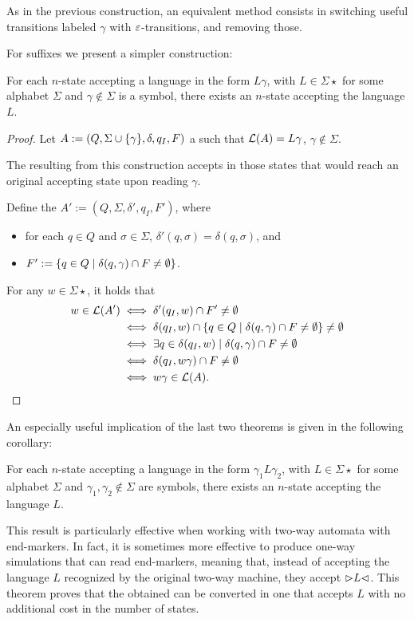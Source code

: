 As in the previous construction, an equivalent method consists in switching useful transitions labeled $\gamma$ with $\varepsilon$-transitions, and removing those.

For suffixes we present a simpler construction:
\begin{thrm}
	For each $n$-state \ONFA accepting a language in the form $L\gamma$, with $L\in\Sigma\star$ for some alphabet $\Sigma$ and $\gamma\notin\Sigma$ is a symbol, there exists an $n$-state \ONFA accepting the language $L$.
\end{thrm}
\begin{proof}
	Let $A:=(Q,\Sigma\cup\{\gamma\},\delta,q_I,F)$ a \ONFA such that $\mathcal L(A)=L\gamma$, $\gamma\notin\Sigma$.

	The \ONFA resulting from this construction accepts in those states that would reach an original accepting state upon reading $\gamma$.

	Define the \ONFA $A':=(Q,\Sigma,\delta',q_I,F')$, where
	\begin{itemize}
		\item for each $q\in Q$ and $\sigma\in\Sigma$, $\delta'(q,\sigma)=\delta(q,\sigma)$, and
		\item $F':=\{q\in Q\mid \delta(q,\gamma)\cap F\ne\emptyset\}$.
	\end{itemize}

	For any $w\in\Sigma\star$, it holds that
	\begin{align*}
		w\in\mathcal L(A') & \iff \delta'(q_I,w)\cap F'\ne\emptyset                                                 \\
		                 & \iff \delta(q_I,w)\cap \{q\in Q\mid \delta(q,\gamma)\cap F\ne\emptyset\}\ne\emptyset \\
		                 & \iff \exists q\in\delta(q_I,w)\mid \delta(q,\gamma)\cap F\ne\emptyset                  \\
		                 & \iff \delta(q_I,w\gamma)\cap F\ne\emptyset                                             \\
		                 & \iff w\gamma\in\mathcal L(A) \text. \qedhere
	\end{align*}
\end{proof}

An especially useful implication of the last two theorems is given in the following corollary:
\begin{coro}
	For each $n$-state \ONFA accepting a language in the form $\gamma_1 L\gamma_2$, with $L\in\Sigma\star$ for some alphabet $\Sigma$ and $\gamma_1,\gamma_2\notin\Sigma$ are symbols, there exists an $n$-state \ONFA accepting the language $L$.
\end{coro}
This result is particularly effective when working with two-way automata with end-markers.
In fact, it is sometimes more effective to produce one-way simulations that can read end-markers, meaning that, instead of accepting the language $L$ recognized by the original two-way machine, they accept $\rhd L\lhd$.
This theorem proves that the obtained \ONFA can be converted in one that accepts $L$ with no additional cost in the number of states.




